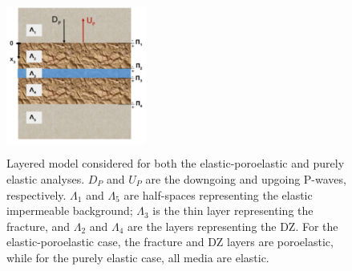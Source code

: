 \documentclass[draft]{agujournal2019}
\begin{document}
 \begin{figure}[!ht]
\centering
        \includegraphics[width= 46mm, height=51mm]{./Figure1.pdf}
\caption{ Layered model considered for both the elastic-poroelastic  and purely elastic analyses. $D_P$ and $U_P$ are the downgoing and upgoing P-waves, respectively. $\Lambda_1$ and $\Lambda_5$ are half-spaces representing the elastic impermeable background; $\Lambda_3$ is the thin layer representing the  fracture, and $\Lambda_2$ and $\Lambda_4$ are the layers representing the DZ. For the elastic-poroelastic case, the fracture and DZ layers are poroelastic, while for the purely elastic case, all media are elastic. }
\label{fig:1}
\end{figure}
\end{document}
